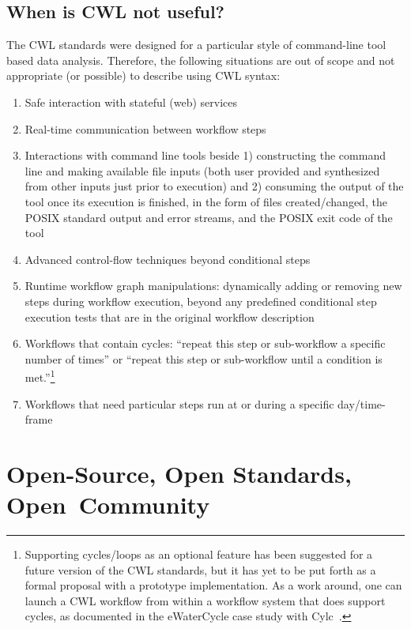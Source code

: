 \documentclass[sigconf,revew,screen,timestamp,nonacm]{acmart}
\newcommand{\addition}[1]{{\color{brown} #1}}
\newcommand{\todortwo}[1]{\todo[linecolor=white,color=KamPurple!40]{R2.#1}}
\begin{document}
\addition{
\subsection{When is CWL not useful?} \label{sec:limitations}
\todortwo{1}The CWL standards were designed for a particular style of command-line tool based data analysis. Therefore, the following situations are out of scope and not appropriate (or possible) to describe using CWL syntax:

\begin{enumerate}
\item Safe interaction with stateful (web) services
\item Real-time communication between workflow steps
\item Interactions with command line tools beside 1) constructing the command line and making available file inputs (both user provided and synthesized from other inputs just prior to execution) and 2) consuming the output of the tool once its execution is finished, in the form of files created/changed, the POSIX standard output and error streams, and the POSIX exit code of the tool
\item Advanced control-flow techniques beyond conditional steps
\item Runtime workflow graph manipulations: dynamically adding or removing new steps during workflow execution, beyond any predefined conditional step execution tests that are in the original workflow description
\item Workflows that contain cycles: ``repeat this step or sub-workflow a specific number of times'' or ``repeat this step or sub-workflow until a condition is met.''\footnote{Supporting cycles/loops as an optional feature has been suggested for a future version of the CWL standards, but it has yet to be put forth as a formal proposal with a prototype implementation. As a work around, one can launch a CWL workflow from within a workflow system that does support cycles, as documented in the eWaterCycle case study with Cylc~\cite{oliver_workflow_2019}.}
\item Workflows that need particular steps run at or during a specific day/time-frame
\end{enumerate}
}

\section{Open-Source, Open Standards, Open~Community} \label{sec:open}
\end{document}
